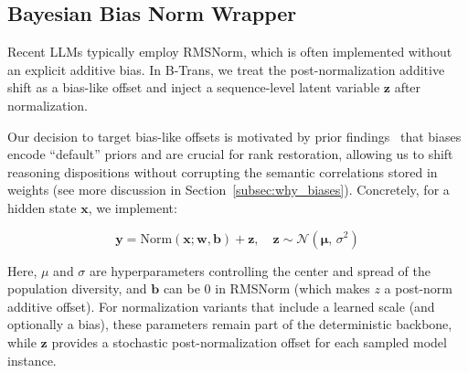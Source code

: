 \documentclass[11pt]{article}
\begin{document}
\subsection{Bayesian Bias Norm Wrapper}
Recent LLMs typically employ RMSNorm, which is often implemented without an explicit additive bias. 
In B-Trans, we treat the post-normalization additive shift as a bias-like offset and inject a sequence-level latent variable $\mathbf{z}$ after normalization. 

Our decision to target bias-like offsets is motivated by prior findings~\cite{elhage2021mathematical,dong2021attention} that biases encode ``default'' priors and are crucial for rank restoration, allowing us to shift reasoning dispositions without corrupting the semantic correlations stored in weights (see more discussion in Section~\ref{subsec:why_biases}).
Concretely, for a hidden state $\mathbf{x}$, we implement:

\begin{equation}
\mathbf{y}
=
\mathrm{Norm}(\mathbf{x};\mathbf{w},\mathbf{b})
+\mathbf{z},
\quad
\mathbf{z}\sim\mathcal{N}(\boldsymbol{\mu},\,\sigma^{2})
\end{equation}

Here, $\mu$ and $\sigma$ are hyperparameters controlling the center and spread of the population diversity, and $\mathbf{b}$ can be 0 in RMSNorm (which makes $z$ a post-norm additive offset).
For normalization variants that include a learned scale (and optionally a bias), these parameters remain part of the deterministic backbone, while $\mathbf{z}$ provides a stochastic post-normalization offset for each sampled model instance. 
\end{document}
